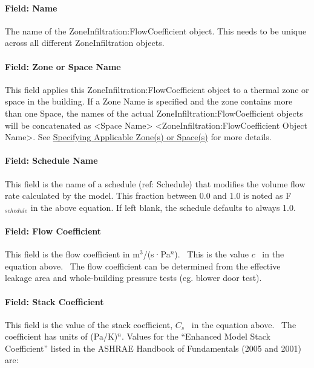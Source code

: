 \paragraph{Field: Name}\label{field-name-2-004}

The name of the ZoneInfiltration:FlowCoefficient object. This needs to be unique across all different ZoneInfiltration objects.

\paragraph{Field: Zone or Space Name}\label{field-zone-name-1-001}

This field applies this ZoneInfiltration:FlowCoefficient object to a thermal zone or space in the building. If a Zone Name is specified and the zone contains more than one Space, the names of the actual ZoneInfiltration:FlowCoefficient objects will be concatenated as \textless{}Space Name\textgreater{} \textless{}ZoneInfiltration:FlowCoefficient Object Name\textgreater{}. See \hyperref[specifying-applicable-zones-or-spaces]{Specifying Applicable Zone(s) or Space(s)} for more details.

\paragraph{Field: Schedule Name}\label{field-schedule-name-2}

This field is the name of a schedule (ref: Schedule) that modifies the volume flow rate calculated by the model. This fraction between 0.0 and 1.0 is noted as F\(_{schedule}\) in the above equation. If left blank, the schedule defaults to always 1.0.

\paragraph{Field: Flow Coefficient}\label{field-flow-coefficient}

This field is the flow coefficient in m\(^{3}\)/(s·Pa\(^{n}\)).~ This is the value \(c\) ~in the equation above.~ The flow coefficient can be determined from the effective leakage area and whole-building pressure tests (eg. blower door test).

\paragraph{Field: Stack Coefficient}\label{field-stack-coefficient-1}

This field is the value of the stack coefficient, \({C_s}\) ~in the equation above.~ The coefficient has units of (Pa/K)\(^{n}\). Values for the ``Enhanced Model Stack Coefficient'' listed in the ASHRAE Handbook of Fundamentals (2005 and 2001) are:

